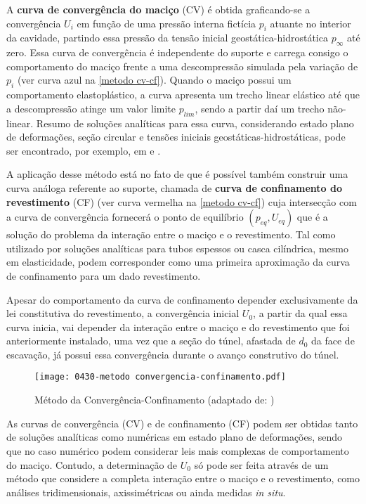 A \textbf{curva de convergência do maciço} (CV) é obtida graficando-se a convergência $U_i$ em função de uma pressão interna fictícia $p_i$ atuante no interior da cavidade, partindo essa pressão da tensão inicial geostática-hidrostática $p_\infty$ até zero. Essa curva de convergência é independente do suporte e carrega consigo o comportamento do maciço frente a uma descompressão simulada pela variação de $p_i$ (ver curva azul na \autoref{metodo cv-cf}). Quando o maciço possui um comportamento elastoplástico, a curva apresenta um trecho linear elástico até que a descompressão atinge um valor limite $p_{lim}$, sendo a partir daí um trecho não-linear. Resumo de soluções analíticas para essa curva, considerando estado plano de deformações, seção circular e tensões iniciais geostáticas-hidrostáticas, pode ser encontrado, por exemplo, em  e .

A aplicação desse método está no fato de que é possível também construir uma curva análoga referente ao suporte, chamada de \textbf{curva de confinamento do revestimento} (CF) (ver curva vermelha na \autoref{metodo cv-cf}) cuja intersecção com a curva de convergência fornecerá o ponto de equilíbrio $(p_{eq},U_{eq})$ que é a solução do problema da interação entre o maciço e o revestimento. Tal como utilizado por  soluções analíticas para tubos espessos ou casca cilíndrica, mesmo em elasticidade, podem corresponder como uma primeira aproximação da curva de confinamento para um dado revestimento.

Apesar do comportamento da curva de confinamento depender exclusivamente da lei constitutiva do revestimento, a convergência inicial $U_0$, a partir da qual essa curva inicia, vai depender da interação entre o maciço e do revestimento que foi anteriormente instalado, uma vez que a seção do túnel, afastada de $d_0$ da face de escavação, já possui essa convergência durante o avanço construtivo do túnel.

\begin{figure}[H]
	\begin{center}
		\texttt{[image: 0430-metodo convergencia-confinamento.pdf]}
	\end{center}
	\caption{\label{metodo cv-cf}Método da Convergência-Confinamento (adaptado de: )}
\end{figure}

As curvas de convergência (CV) e de confinamento (CF) podem ser obtidas tanto de soluções analíticas como numéricas em estado plano de deformações, sendo que no caso numérico podem considerar leis mais complexas de comportamento do maciço. Contudo, a determinação de $U_0$ só pode ser feita através de um método que considere a completa interação entre o maciço e o revestimento, como análises tridimensionais, axissimétricas ou ainda medidas \textit{in situ}.

